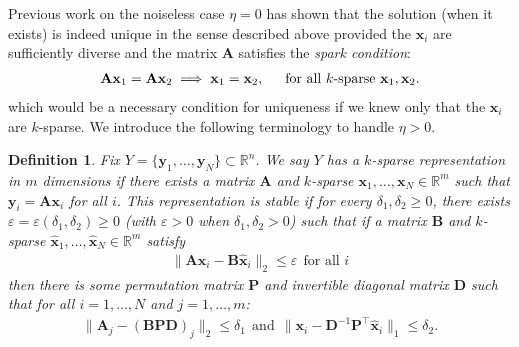 \documentclass[9pt,twocolumn]{pnas-new}
\newtheorem{definition}{Definition}
\begin{document}
Previous work \cite{li2004analysis, Georgiev05, Aharon06, Hillar15} on the noiseless case $\eta = 0$ has shown that the solution (when it exists) is indeed unique in the sense described above provided the $\mathbf{x}_i$ are sufficiently diverse and the matrix $\mathbf{A}$ satisfies the \textit{spark condition}:
\begin{align}\label{SparkCondition}
\mathbf{A}\mathbf{x}_1 = \mathbf{A}\mathbf{x}_2 \implies \mathbf{x}_1 = \mathbf{x}_2,\indent \text{for all $k$-sparse } \mathbf{x}_1, \mathbf{x}_2.
\end{align}
%
which would be a necessary condition for uniqueness if we knew only that the $\mathbf{x}_i$ are $k$-sparse. We introduce the following terminology to handle $\eta > 0$. 
\begin{definition}
Fix $Y = \{ \mathbf{y}_1, \ldots, \mathbf{y}_N\} \subset \mathbb{R}^n$. We say $Y$ has a \emph{$k$-sparse representation in $m$ dimensions} if there exists a matrix $\mathbf{A}$ and $k$-sparse $\mathbf{x}_1, \ldots, \mathbf{x}_N \in \mathbb{R}^m$ such that $\mathbf{y}_i = \mathbf{A}\mathbf{x}_i$ for all $i$. %
This representation is \emph{stable} if for every $\delta_1, \delta_2 \geq 0$, there exists $\varepsilon = \varepsilon(\delta_1, \delta_2) \geq 0$ (with $\varepsilon > 0$ when  $\delta_1, \delta_2 > 0$) such that if a matrix $\mathbf{B}$ and $k$-sparse $\mathbf{\hat x}_1, \ldots, \mathbf{\hat x}_N \in \mathbb{R}^m$ satisfy
\begin{align*}
\|\mathbf{A}\mathbf{x}_i - \mathbf{B}\mathbf{\hat x}_i\|_2 \leq \varepsilon \ \ \text{for all $i$}
\end{align*}
%
then there is some permutation matrix $\mathbf{P}$ and invertible diagonal matrix $\mathbf{D}$ such that for all $i = 1,\ldots,N$ and $j = 1,\ldots,m$:
\begin{align}\label{def1}
\|\mathbf{A}_j - (\mathbf{BPD})_j\|_2 \leq \delta_1 \ \ \text{and} \ \ \|\mathbf{x}_i - \mathbf{D}^{-1}\mathbf{P}^{\top}\mathbf{\hat x}_i\|_1 \leq \delta_2.
\end{align}
\end{definition}
\end{document}
